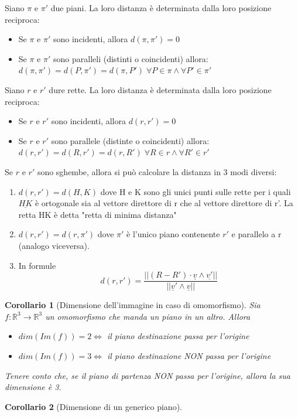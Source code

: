 \documentclass[12pt]{article}
\newenvironment{para}{\begin{adjustwidth}{13mm}{}}{\end{adjustwidth}}
\newtheorem{Corollario}{Corollario}[subsection]
\begin{document}
\begin{para}
\begin{itemize}
\end{itemize}
Siano $\pi$ e $\pi'$ due piani. La loro distanza è determinata dalla loro posizione reciproca:
\begin{itemize}
    \item Se $\pi$ e $\pi'$ sono incidenti, allora $d(\pi, \pi') = 0$
    \item Se $\pi$ e $\pi'$ sono paralleli (distinti o coincidenti) allora: $d(\pi, \pi') = d(P, \pi') = d(\pi, P') \; \forall P \in \pi \land \forall P' \in \pi'$
\end{itemize}
Siano $r$ e $r'$ dure rette. La loro distanza è determinata dalla loro posizione reciproca:
\begin{itemize}
    \item Se $r$ e $r'$ sono incidenti, allora $d(r, r')=0$
    \item Se $r$ e $r'$ sono parallele (distinte o coincidenti) allora: $d(r, r')=d(R, r')=d(r, R') \; \forall R\in r \land \forall R' \in r'$
\end{itemize}
Se $r$ e $r'$ sono sghembe, allora si può calcolare la distanza in 3 modi diversi:
\begin{enumerate}
    \item $d(r, r')=d(H, K)$ dove H e K sono gli unici punti sulle rette per i quali $\underline{HK}$ è ortogonale sia al vettore direttore di r che al vettore direttore di r'. La retta HK è detta "retta di minima distanza"
    \item $d(r, r') = d(r, \pi')$ dove $\pi'$ è l'unico piano contenente $r'$ e parallelo a r (analogo viceversa).
    \item In formule $$d(r, r')=\frac{\bigl||(R-R')\cdot \underline{v} \land \underline{v'}|\bigr|}{\bigl||\underline{v}'\land \underline{v}|\bigr|}$$
\end{enumerate}
\begin{Corollario}[Dimensione dell'immagine in caso di omomorfismo]
Sia $f:\mathbb{R}^3 \rightarrow \mathbb{R}^3$ un omomorfismo che manda un piano in un altro. Allora \begin{itemize}
    \item $dim(Im(f)) = 2 \Leftrightarrow$ il piano destinazione passa per l'origine
    \item $dim(Im(f)) = 3 \Leftrightarrow$ il piano destinazione NON passa per l'origine
\end{itemize}
Tenere conto che, se il piano di partenza NON passa per l'origine, allora la sua dimensione è 3.
\end{Corollario}
\begin{Corollario}[Dimensione di un generico piano]

\end{Corollario}
\end{para}
\end{document}

